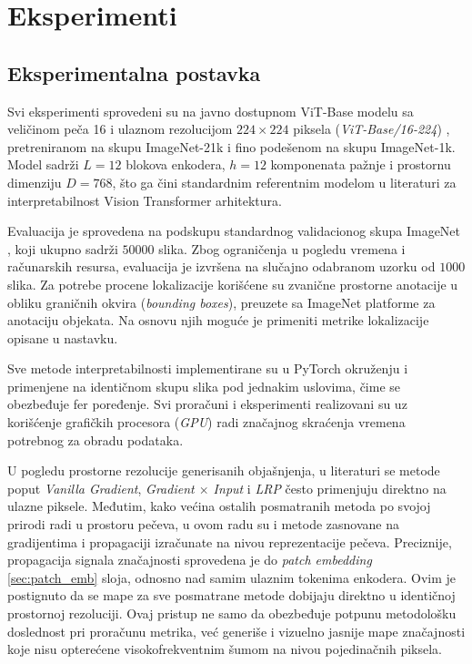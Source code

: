  \section{Eksperimenti}

\subsection{Eksperimentalna postavka}

Svi eksperimenti sprovedeni su na javno dostupnom ViT-Base modelu sa veličinom 
peča 16 i ulaznom rezolucijom $224 \times 224$ piksela (\textit{ViT-Base/16-224}) 
\cite{dosovitskiy2021vit}, pretreniranom na skupu ImageNet-21k i fino podešenom 
na skupu ImageNet-1k. Model sadrži $L=12$ blokova enkodera, $h=12$ komponenata pažnje 
i prostornu dimenziju $D=768$, što ga čini standardnim referentnim modelom u 
literaturi za interpretabilnost Vision Transformer arhitektura.

Evaluacija je sprovedena na podskupu standardnog validacionog skupa ImageNet \cite{russakovsky2015imagenet}, koji ukupno sadrži $50000$ slika. Zbog ograničenja u pogledu vremena i računarskih resursa, evaluacija je izvršena na slučajno odabranom uzorku od $1000$ slika. Za potrebe procene lokalizacije korišćene su zvanične prostorne anotacije u obliku graničnih okvira (\textit{bounding boxes}), preuzete sa ImageNet platforme za anotaciju objekata. Na osnovu njih moguće je primeniti metrike lokalizacije opisane u nastavku.

Sve metode interpretabilnosti implementirane su u PyTorch okruženju i primenjene na identičnom skupu slika pod jednakim uslovima, čime se obezbeđuje fer poređenje. Svi proračuni i eksperimenti realizovani su uz korišćenje grafičkih procesora (\textit{GPU}) radi značajnog skraćenja vremena potrebnog za obradu podataka.

U pogledu prostorne rezolucije generisanih objašnjenja, u literaturi se metode poput \textit{Vanilla Gradient}, \textit{Gradient $\times$ Input} i \textit{LRP} često primenjuju direktno na ulazne piksele. Međutim, kako većina ostalih posmatranih metoda po svojoj prirodi radi u prostoru pečeva, u ovom radu su i metode zasnovane na gradijentima i propagaciji izračunate na nivou reprezentacije pečeva. Preciznije, propagacija signala značajnosti sprovedena je do \textit{patch embedding} \ref{sec:patch_emb} sloja, odnosno nad samim ulaznim tokenima enkodera. Ovim je postignuto da se mape za sve posmatrane metode dobijaju direktno u identičnoj prostornoj rezoluciji. Ovaj pristup ne samo da obezbeđuje potpunu metodološku doslednost pri proračunu metrika, već generiše i vizuelno jasnije mape značajnosti koje nisu opterećene visokofrekventnim šumom na nivou pojedinačnih piksela.

